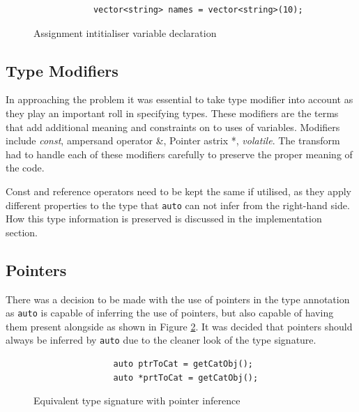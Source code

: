 \documentclass[bsc,frontabs,singlespacing,twoside,parskip,deptreport]{infthesis}
\begin{document}
\begin{figure}[!h]
    \begin{verbatim}
            vector<string> names = vector<string>(10);
    \end{verbatim}
    \caption{Assignment intitialiser variable declaration}
    \label{fig:ass-var}
\end{figure}

\subsection{Type Modifiers}
In approaching the problem it was essential to take type modifier into account as they play an important roll in specifying types. These modifiers are the terms that add additional meaning and constraints on to uses of variables. Modifiers include \textit{const}, ampersand operator \&, Pointer astrix *, \textit{volatile}. The transform had to handle each of these modifiers carefully to preserve the proper meaning of the code. 

Const and reference operators need to be kept the same if utilised, as they apply different properties to the type that \texttt{auto} can not infer from the right-hand side. How this type information is preserved is discussed in the implementation section. 

\subsection{Pointers}
There was a decision to be made with the use of pointers in the type annotation as \texttt{auto} is capable of inferring the use of pointers, but also capable of having them present alongside as shown in Figure \ref{fig:ptr_type_inf}. It was decided that pointers should always be inferred by \texttt{auto} due to the cleaner look of the type signature. 

\begin{figure}[!h]
    \centering
    \begin{verbatim}
                auto ptrToCat = getCatObj();
                auto *prtToCat = getCatObj();
    \end{verbatim}
    \caption{Equivalent type signature with pointer inference}
    \label{fig:ptr_type_inf}
\end{figure}
\end{document}
